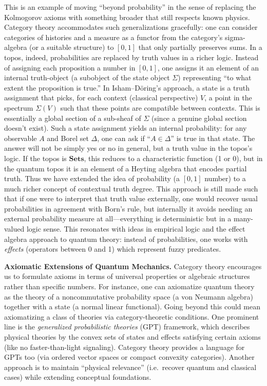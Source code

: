 \documentclass[12pt]{article}
\begin{document}
This is an example of moving ``beyond probability'' in the sense of replacing the Kolmogorov axioms with something broader that still respects known physics. Category theory accommodates such generalizations gracefully: one can consider categories of histories and a measure as a functor from the category’s sigma-algebra (or a suitable structure) to $[0,1]$ that only partially preserves sums. In a topos, indeed, probabilities are replaced by truth values in a richer logic. Instead of assigning each proposition a number in $[0,1]$, one assigns it an element of an internal truth-object (a subobject of the state object $\Sigma$) representing ``to what extent the proposition is true.'' In Isham--Döring’s approach, a state is a truth assignment that picks, for each context (classical perspective) $V$, a point in the spectrum $\Sigma(V)$ such that these points are compatible between contexts. This is essentially a global section of a sub-sheaf of $\Sigma$ (since a genuine global section doesn’t exist). Such a state assignment yields an internal probability: for any observable $A$ and Borel set $\Delta$, one can ask if ``$A\in\Delta$'' is true in that state. The answer will not be simply yes or no in general, but a truth value in the topos’s logic. If the topos is $\mathbf{Sets}$, this reduces to a characteristic function (1 or 0), but in the quantum topos it is an element of a Heyting algebra that encodes partial truth. Thus we have extended the idea of probability (a $[0,1]$ number) to a much richer concept of contextual truth degree. This approach is still made such that if one were to interpret that truth value externally, one would recover usual probabilities in agreement with Born’s rule, but internally it avoids needing an external probability measure at all---everything is deterministic but in a many-valued logic sense. This resonates with ideas in empirical logic and the effect algebra approach to quantum theory: instead of probabilities, one works with \emph{effects} (operators between 0 and 1) which represent fuzzy predicates.

\medskip
\textbf{Axiomatic Extensions of Quantum Mechanics.} Category theory encourages us to formulate axioms in terms of universal properties or algebraic structures rather than specific numbers. For instance, one can axiomatize quantum theory as the theory of a noncommutative probability space (a von Neumann algebra) together with a state (a normal linear functional). Going beyond this could mean axiomatizing a class of theories via category-theoretic conditions. One prominent line is the \emph{generalized probabilistic theories} (GPT) framework, which describes physical theories by the convex sets of states and effects satisfying certain axioms (like no faster-than-light signaling). Category theory provides a language for GPTs too (via ordered vector spaces or compact convexity categories). Another approach is to maintain ``physical relevance'' (i.e.\ recover quantum and classical cases) while extending conceptual foundations.
\end{document}
